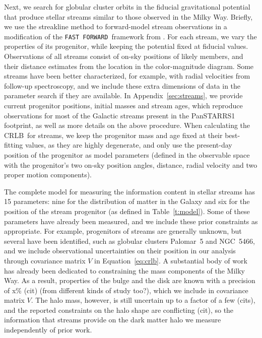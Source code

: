 \documentclass[modern]{aastex61}
\newcommand{\acronym}[1]{{\small{#1}}}
\newcommand{\CRLB}{\acronym{CRLB}}
\newcommand{\FF}{\texttt{FAST FORWARD}}
\begin{document}
Next, we search for globular cluster orbits in the fiducial gravitational potential that produce stellar streams similar to those observed in the Milky Way.
Briefly, we use the streakline method to forward-model stream observations in a modification of the \FF\ framework from \citet{bonaca2014}.
For each stream, we vary the properties of its progenitor, while keeping the potential fixed at fiducial values.
Observations of all streams consist of on-sky positions of likely members, and their distance estimates from the location in the color-magnitude diagram.
Some streams have been better characterized, for example, with radial velocities from follow-up spectroscopy, and we include these extra dimensions of data in the parameter search if they are available.
In Appendix~\ref{sec:streams}, we provide current progenitor positions, initial masses and stream ages, which reproduce observations for most of the Galactic streams present in the PanSTARRS1 footprint, as well as more details on the above procedure.
When calculating the \CRLB\ for streams, we keep the progenitor mass and age fixed at their best-fitting values, as they are highly degenerate, and only use the present-day position of the progenitor as model parameters (defined in the observable space with the progenitor's two on-sky position angles, distance, radial velocity and two proper motion components). 

The complete model for measuring the information content in stellar streams has 15 parameters: nine for the distribution of matter in the Galaxy and six for the position of the stream progenitor (as defined in Table~\ref{t:model}).
Some of these parameters have already been measured, and we include these prior constraints as appropriate. 
For example, progenitors of streams are generally unknown, but several have been identified, such as globular clusters Palomar~5 and NGC~5466, and we include observational uncertainties on their position in our analysis through covariance matrix $V$ in Equation~\ref{eq:crlb}.
A substantial body of work has already been dedicated to constraining the mass components of the Milky Way.
As a result, properties of the bulge and the disk are known with a precision of x\% (cit) (from different kinds of study too?), which we include in covariance matrix $V$.
The halo mass, however, is still uncertain up to a factor of a few (cits), and the reported constraints on the halo shape are conflicting (cit), so the information that streams provide on the dark matter halo we measure independently of prior work.
\end{document}
